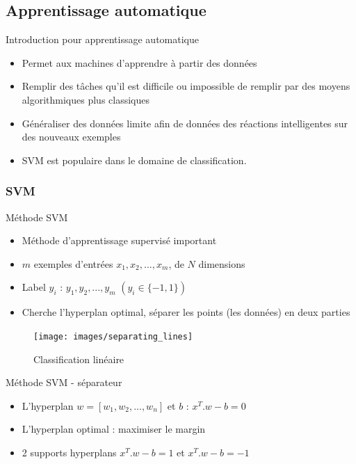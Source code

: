 \documentclass[11pt]{beamer}
\begin{document}
\begin{otherlanguage}{french}
\subsection{Apprentissage automatique}
\begin{frame}{Introduction pour apprentissage automatique}
\begin{itemize}
\item Permet aux machines d'apprendre à partir des données
\item Remplir des tâches qu'il est difficile ou impossible de remplir par des moyens algorithmiques plus classiques
\item Généraliser des données limite afin de données des réactions intelligentes sur des nouveaux exemples
\item SVM est populaire dans le domaine de classification.
\end{itemize}
\end{frame}

\subsubsection*{SVM}
\begin{frame}{Méthode SVM}
\begin{itemize}
\item Méthode d'apprentissage supervisé important
\item $m$ exemples d'entrées $x_1, x_2, ..., x_m$, de $N$ dimensions
\item Label $y_i$ : $y_1, y_2, ..., y_m$ $(y_i \in \{-1,1\})$
\item Cherche l'hyperplan optimal, séparer les points (les données) en deux parties
\end{itemize}

\begin{figure}[ht!]
\centering
\texttt{[image: images/separating\_lines]}
\caption{Classification linéaire}
\label{slines}
\end{figure}

\end{frame}

\begin{frame}{Méthode SVM - séparateur}
\begin{itemize}
\item L'hyperplan $w=[w_1,w_2,...,w_n]$ et $b$ : $x^T.w - b = 0$
\item L'hyperplan optimal : maximiser le margin
\item 2 supports hyperplans $x^T.w - b = 1$ et $x^T.w - b = -1$
\end{itemize}


\end{frame}
\end{otherlanguage}
\end{document}
